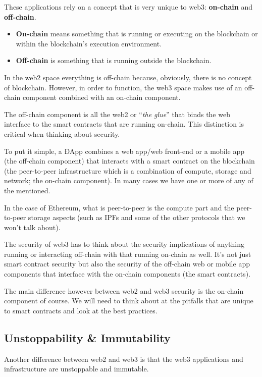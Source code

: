 These applications rely on a concept that is very unique to web3:
\textbf{on-chain} and \textbf{off-chain}.

\begin{itemize}
\tightlist
\item
  \textbf{On-chain} means something that is running or executing on the
  blockchain or within the blockchain's execution environment.
\item
  \textbf{Off-chain} is something that is running outside the
  blockchain.
\end{itemize}

In the web2 space everything is off-chain because, obviously, there is
no concept of blockchain. However, in order to function, the web3 space
makes use of an off-chain component combined with an on-chain component.

The off-chain component is all the web2 or ``\emph{the glue}'' that
binds the web interface to the smart contracts that are running
on-chain. This distinction is critical when thinking about security.

To put it simple, a ÐApp combines a web app/web front-end or a mobile
app (the off-chain component) that interacts with a smart contract on
the blockchain (the peer-to-peer infrastructure which is a combination
of compute, storage and network; the on-chain component). In many cases
we have one or more of any of the mentioned.

In the case of Ethereum, what is peer-to-peer is the compute part and
the peer-to-peer storage aspects (such as IPFs and some of the other
protocols that we won't talk about).

The security of web3 has to think about the security implications of
anything running or interacting off-chain with that running on-chain as
well. It's not just smart contract security but also the security of the
off-chain web or mobile app components that interface with the on-chain
components (the smart contracts).

The main difference however between web2 and web3 security is the
on-chain component of course. We will need to think about at the
pitfalls that are unique to smart contracts and look at the best
practices.

\subsection{Unstoppability \&
Immutability}\label{unstoppability-immutability}

Another difference between web2 and web3 is that the web3 applications
and infrastructure are unstoppable and immutable.

